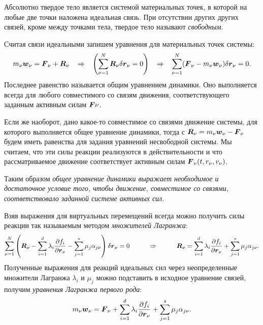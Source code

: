 Абсолютно твердое тело является системой материальных точек, в которой на любые две точки наложена идеальная связь. При отсутствии других других связей, кроме между точками тела, твердое тело называют \textit{свободным}.

Считая связи идеальными запишем уравнения для материальных точек системы:
\begin{equation*}
	m_{\nu} \mbox{\boldmath $w$}_\nu = \mbox{\boldmath $F$}_\nu + \mbox{\boldmath $R$}_\nu
	\hspace*{0.3 cm}
	\Rightarrow
	\hspace*{0.3 cm}
	\left(
	\sum_{\nu=1}^N \mbox{\boldmath $R$}_\nu \delta \mbox{\boldmath $r$}_\nu = 0\right)
	\hspace*{0.3 cm}
	\Rightarrow
	\hspace*{0.3 cm}
	\sum_{\nu = 1}^{N}(\mbox{\boldmath $F$}_\nu - m_\nu \mbox{\boldmath $w$}_\nu) \delta \mbox{\boldmath $r$}_{\nu} = 0.
\end{equation*}
Последнее равенство называется общим уравнением динамики. Оно выполняется всегда для любого совместимого со связям движения, соответствующего заданным активным силам $\mbox{\boldmath $F$}{\nu}$.

Если же наоборот, дано какое-то совместимое со связями движение системы, для которого выполняется общее уравнение динамики, тогда с $\mbox{\boldmath $R$}_\nu = m_\nu \mbox{\boldmath $w$}_\nu - \mbox{\boldmath $F$}_\nu$ будем иметь равенства для задания уравнений несвободной системы. Мы считаем, что эти силы реакции реализуются в действительности и что рассматриваемое движение соответствует активным силам $\mbox{\boldmath $F$}_\nu (t,r_\nu, v_\nu)$.

Таким образом  \textit{общее уравнение динамики выражает необходимое и достаточное условие того, чтобы движение, совместимое со связями, соответствовало заданной системе активных сил}.

Взяв выражения для виртуальных перемещений всегда можно получить силы реакции так называемым методом \textit{множителей Лагранжа}:
\begin{equation*}
	\sum_{\nu=1}^N \left(\mbox{\boldmath $R$}_\nu - \sum_{i = 1}^d \lambda_i \frac{\partial f_i}{\partial \mbox{\boldmath $r$}_\nu} - \sum_{j = 1}^s \mu_j \alpha_{j \nu}\right) \delta \mbox{\boldmath $r$}_\nu = 0
	\hspace*{1 cm}
	\Rightarrow
	\hspace*{1 cm}
	\mbox{\boldmath $R$}_\nu = \sum_{i = 1}^d \lambda_i \frac{\partial f_i}{\partial \mbox{\boldmath $r$}_\nu} + \sum_{j = 1}^s \mu_j \alpha_{j \nu}.
\end{equation*}
Полученные выражения для реакций идеальных сил через неопределенные множители Лагранжа $\lambda_i $ и $\mu_j $ можно подставить в исходное уравнение связей, получим \textit{уравнения Лагранжа первого рода}:
\begin{equation*}
	m_\nu \mbox{\boldmath $w$}_\nu = \mbox{\boldmath $F$}_\nu + \sum_{i = 1}^d \lambda_i \frac{\partial f_i}{\partial \mbox{\boldmath $r$}_\nu} + \sum_{j = 1}^s \mu_j \alpha_{j \nu}.
\end{equation*}
